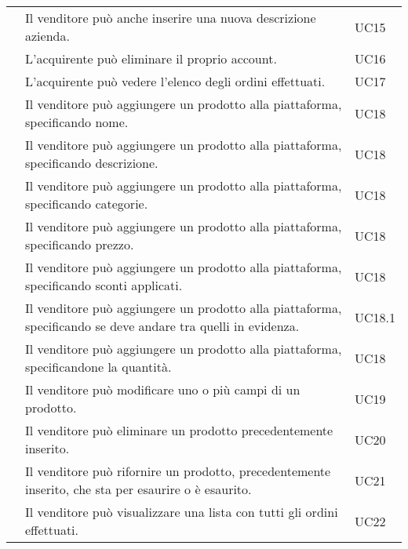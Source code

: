 \begin{longtable}{|c C{9.5cm} C{2.5cm}|}
     & Il venditore può anche inserire una nuova descrizione azienda. & UC15 \\
    
     & L'acquirente può eliminare il proprio account. & UC16 \\
    
     & L'acquirente può vedere l'elenco degli ordini effettuati. & UC17 \\
    
     & Il venditore può aggiungere un prodotto alla piattaforma, specificando nome. & UC18 \\
    
     & Il venditore può aggiungere un prodotto alla piattaforma, specificando descrizione. & UC18 \\
    
     & Il venditore può aggiungere un prodotto alla piattaforma, specificando categorie. & UC18 \\
    
     & Il venditore può aggiungere un prodotto alla piattaforma, specificando prezzo. & UC18 \\
    
     & Il venditore può aggiungere un prodotto alla piattaforma, specificando sconti applicati. & UC18 \\
    
     & Il venditore può aggiungere un prodotto alla piattaforma, specificando se deve andare tra quelli in evidenza. & UC18.1 \\
    
     & Il venditore può aggiungere un prodotto alla piattaforma, specificandone la quantità. & UC18 \\
    
     & Il venditore può modificare uno o più campi di un prodotto. & UC19 \\
    
     & Il venditore può eliminare un prodotto precedentemente inserito. & UC20 \\
    
     & Il venditore può rifornire un prodotto, precedentemente inserito, che sta per esaurire o è esaurito. & UC21 \\
    
     & Il venditore può visualizzare una lista con tutti gli ordini effettuati. & UC22 \\
    

\end{longtable}
